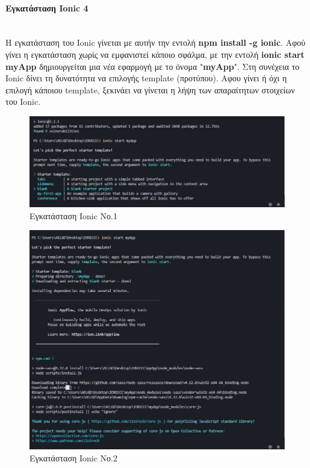 \documentclass[a4paper,12pt]{article}
\newcommand{\myparagraph}[1]{\paragraph{#1}\mbox{}\\}
\begin{document}
				\myparagraph{Εγκατάσταση Ionic 4} 
				Η εγκατάσταση του Ionic γίνεται με αυτήν την εντολή \textbf{npm install -g ionic}.
				Αφού γίνει η εγκατάσταση χωρίς να εμφανιστεί κάποιο σφάλμα, με την εντολή \textbf{ionic start myApp} δημιουργείται μια νέα εφαρμογή με το 
				όνομα "\textbf{myApp}". Στη συνέχεια το Ionic  δίνει τη δυνατότητα να επιλογής template (προτύπου). Αφου γίνει ή όχι η επιλογή κάποιου template, 
				ξεκινάει να γίνεται η λήψη των απαραίτητων στοιχείων του Ionic.
				
				\begin{figure}[!htb]
					\begin{center}
						\caption{Εγκατάσταση Ionic Νο.1}
						\vspace*{0.5cm}

						\includegraphics[width=\linewidth]{ionic1} 
					\end{center}
				\end{figure}

				\begin{figure}[!htb]
				\begin{center}
					\caption{Εγκατάσταση Ionic Νο.2}
					\vspace*{0.5cm}
						\includegraphics[width=\linewidth]{ionic2} 
					\end{center}
				\end{figure}
\end{document}

